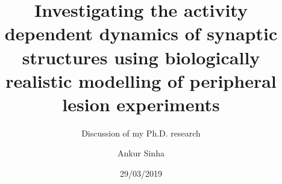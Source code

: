 
\usepackage{color}
\usepackage{tipa}
\usepackage[scale=2]{ccicons}
\usepackage{amssymb}
\usepackage{tikz}
\usetikzlibrary{arrows.meta, arrows}
\usepackage{pgfplots}
\usepackage{jneurosci}
\usepackage{subfig}
\usepackage[T1]{fontenc}
\usepackage[utf8]{inputenc}
\usepackage[style=nature,backend=biber,autocite=footnote]{biblatex}

\usepackage[default,osfigures,scale=0.95]{opensans}
\usepackage[normalem]{ulem}
\usepackage{hyperref}
\hypersetup{colorlinks,linkcolor=Green,urlcolor=links}
\usepackage{graphicx}
\usepackage{algorithmic}
\usepackage{textcomp}
\usepackage{wrapfig}
\usepackage{textgreek}
\usepackage{euler}



\title{Investigating the activity dependent dynamics of synaptic structures using biologically realistic modelling of peripheral lesion experiments}
\subtitle{Discussion of my Ph.D. research}
\author[Ankur Sinha]{Ankur Sinha}
\date{29/03/2019}



\begin{frame}
  \titlepage{}
\end{frame}

